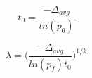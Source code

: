 \begin{equation}
\label{eq:t_zero}
    t_0 = \frac{-\Delta_{avg}}{ln(p_0)}
\end{equation}

\begin{equation}
\label{eq:lambda}
    \lambda = \bigg( \frac{-\Delta_{avg}}{ln(p_f)t_0} \bigg)^{1/k}
\end{equation}















